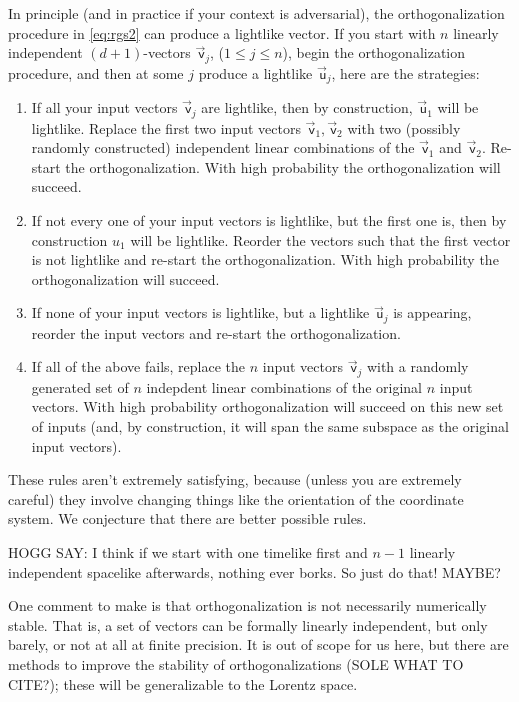 \documentclass{article}
\newcommand\upvec[1]{\!\vec{\,\mathrm{#1}}}
\newcommand{\Lvec}[1]{\upvec{\mathsf{#1}}} %
\newcommand{\plus}{\!+\!} %
\begin{document}
In principle (and in practice if your context is adversarial), the orthogonalization procedure in \eqref{eq:rgs2} can produce a lightlike vector.
If you start with $n$ linearly independent $(d\plus1)$-vectors $\Lvec{v}_j$, ($1\leq j\leq n$), begin the orthogonalization procedure, and then at some $j$ produce a lightlike $\Lvec{u}_j$, here are the strategies:
\begin{enumerate}
\item If all your input vectors $\Lvec{v}_j$ are lightlike, then by construction, $\Lvec{u}_1$ will be lightlike.
    Replace the first two input vectors $\Lvec{v}_1,\Lvec{v}_2$ with two (possibly randomly constructed) independent linear combinations of the $\Lvec{v}_1$ and $\Lvec{v}_2$.
    Re-start the orthogonalization.
    With high probability the orthogonalization will succeed.
    \item If not every one of your input vectors is lightlike, but the first one is, then by construction ${u}_1$ will be lightlike.
    Reorder the vectors such that the first vector is not lightlike and re-start the orthogonalization.
    With high probability the orthogonalization will succeed.
    \item If none of your input vectors is lightlike, but a lightlike $\Lvec{u}_j$ is appearing, reorder the input vectors and re-start the orthogonalization.
    \item If all of the above fails, replace the $n$ input vectors $\Lvec{v}_j$ with a randomly generated set of $n$ indepdent linear combinations of the original $n$ input vectors.
    With high probability orthogonalization will succeed on this new set of inputs (and, by construction, it will span the same subspace as the original input vectors).
\end{enumerate}
These rules aren't extremely satisfying, because (unless you are extremely careful) they involve changing things like the orientation of the coordinate system.
We conjecture that there are better possible rules.

HOGG SAY: I think if we start with one timelike first and $n-1$ linearly independent spacelike afterwards, nothing ever borks.
So just do that! MAYBE?

One comment to make is that orthogonalization is not necessarily numerically stable.
That is, a set of vectors can be formally linearly independent, but only barely, or not at all at finite precision.
It is out of scope for us here, but there are methods to improve the stability of orthogonalizations (SOLE WHAT TO CITE?); these will be generalizable to the Lorentz space.
\end{document}
